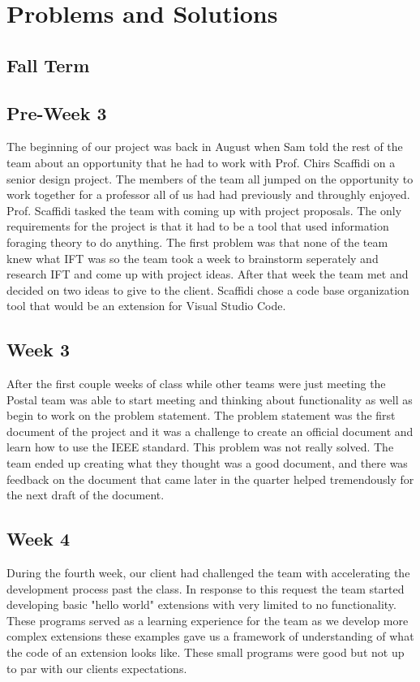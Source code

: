 \documentclass[letterpaper,10pt,titlepage,draftclsnofoot,onecolumn,onesided] {IEEEtran}
\begin{document}
\section{Problems and Solutions}
	\subsection{Fall Term}
	\subsection{Pre-Week 3}
	The beginning of our project was back in August when Sam told the rest of the team about an opportunity that he had to work with Prof. Chirs Scaffidi on a senior design project. 
	The members of the team all jumped on the opportunity to work together for a professor all of us had had previously and throughly enjoyed.
	Prof. Scaffidi tasked the team with coming up with project proposals.
	The only requirements for the project is that it had to be a tool that used information foraging theory to do anything.
	The first problem was that none of the team knew what IFT was so the team took a week to brainstorm seperately and research IFT and come up with project ideas.
	After that week the team met and decided on two ideas to give to the client.
	Scaffidi chose a code base organization tool that would be an extension for Visual Studio Code.
	
	\subsection{Week 3}
	After the first couple weeks of class while other teams were just meeting the Postal team was able to start meeting and thinking about functionality as well as begin to work on the problem statement.
	The problem statement was the first document of the project and it was a challenge to create an official document and learn how to use the IEEE standard. 
	This problem was not really solved.
	The team ended up creating what they thought was a good document, and there was feedback on the document that came later in the quarter helped tremendously for the next draft of the document.
	
	\subsection{Week 4}
	During the fourth week, our client had challenged the team with accelerating the development process past the class.
	In response to this request the team started developing basic "hello world" extensions with very limited to no functionality.
	These programs served as a learning experience for the team as we develop more complex extensions these examples gave us a framework of understanding of what the code of an extension looks like.
	These small programs were good but not up to par with our clients expectations.	
	
\end{document}
